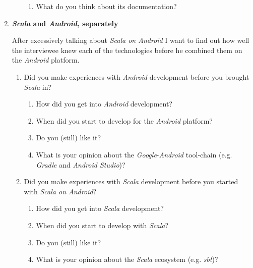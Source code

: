 \begin{enumerate}
\begin{enumerate}
\begin{enumerate}
			\item What do you think about its documentation?

		\end{enumerate}

	\end{enumerate}

	\item \textbf{\textit{Scala} and \textit{Android}, separately}

	After excessively talking about \textit{Scala on Android} I want to find out how well the interviewee knew each of the technologies before he combined them on the \textit{Android} platform.

	\begin{enumerate}

		\item Did you make experiences with \textit{Android} development before you brought \textit{Scala} in?

		\begin{enumerate}

			\item How did you get into \textit{Android} development?

			\item When did you start to develop for the \textit{Android} platform?

			\item Do you (still) like it?

			\item What is your opinion about the \textit{Google}-\textit{Android} tool-chain (e.g. \textit{Gradle} and \textit{Android Studio})?

		\end{enumerate}

		\item Did you make experiences with \textit{Scala} development before you started with \textit{Scala on Android}?

		\begin{enumerate}

			\item How did you get into \textit{Scala} development?

			\item When did you start to develop with \textit{Scala}?

			\item Do you (still) like it?

			\item What is your opinion about the \textit{Scala} ecosystem (e.g. \textit{sbt})?


\end{enumerate}
\end{enumerate}
\end{enumerate}
